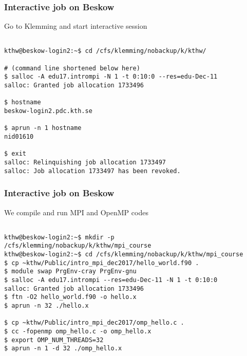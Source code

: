 \begin{frame}[fragile]
  \frametitle{Interactive job on Beskow}
  \begin{alertblock}{Go to Klemming and start interactive session}
    \verbatimfont{\footnotesize}
    \begin{verbatim}

kthw@beskow-login2:~$ cd /cfs/klemming/nobackup/k/kthw/

# (command line shortened below here)
$ salloc -A edu17.intrompi -N 1 -t 0:10:0 --res=edu-Dec-11
salloc: Granted job allocation 1733496

$ hostname
beskow-login2.pdc.kth.se

$ aprun -n 1 hostname
nid01610

$ exit
salloc: Relinquishing job allocation 1733497
salloc: Job allocation 1733497 has been revoked.

 \end{verbatim}
\end{alertblock}



\end{frame}



\begin{frame}[fragile]
  \frametitle{Interactive job on Beskow}
  \begin{alertblock}{We compile and run MPI and OpenMP codes}
    \verbatimfont{\footnotesize}
    \begin{verbatim}

kthw@beskow-login2:~$ mkdir -p /cfs/klemming/nobackup/k/kthw/mpi_course
kthw@beskow-login2:~$ cd /cfs/klemming/nobackup/k/kthw/mpi_course
$ cp ~kthw/Public/intro_mpi_dec2017/hello_world.f90 .
$ module swap PrgEnv-cray PrgEnv-gnu
$ salloc -A edu17.intrompi --res=edu-Dec-11 -N 1 -t 0:10:0
salloc: Granted job allocation 1733496
$ ftn -O2 hello_world.f90 -o hello.x
$ aprun -n 32 ./hello.x

$ cp ~kthw/Public/intro_mpi_dec2017/omp_hello.c .
$ cc -fopenmp omp_hello.c -o omp_hello.x
$ export OMP_NUM_THREADS=32
$ aprun -n 1 -d 32 ./omp_hello.x

 \end{verbatim}
\end{alertblock}



\end{frame}




